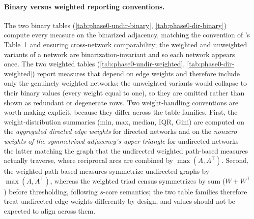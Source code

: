 \documentclass[11pt]{article}
\begin{document}
\paragraph{Binary versus weighted reporting conventions.} The two binary tables (\ref{tab:phase0-undir-binary}, \ref{tab:phase0-dir-binary}) compute every measure on the binarized adjacency, matching the convention of \citet{SmithMorganMoody2022}'s Table~1 and ensuring cross-network comparability; the weighted and unweighted variants of a network are binarization-invariant and so each network appears once. The two weighted tables (\ref{tab:phase0-undir-weighted}, \ref{tab:phase0-dir-weighted}) report measures that depend on edge weights and therefore include only the genuinely weighted networks: the unweighted variants would collapse to their binary values (every weight equal to one), so they are omitted rather than shown as redundant or degenerate rows. Two weight-handling conventions are worth making explicit, because they differ across the table families. First, the weight-distribution summaries (min, max, median, IQR, Gini) are computed on the \emph{aggregated directed edge weights} for directed networks and on the \emph{nonzero weights of the symmetrized adjacency's upper triangle} for undirected networks~--- the latter matching the graph that the undirected weighted path-based measures actually traverse, where reciprocal arcs are combined by $\max(A, A^\top)$. Second, the weighted path-based measures symmetrize undirected graphs by $\max(A, A^\top)$, whereas the weighted triad census symmetrizes by sum ($W + W^\top$) before thresholding, following $s$-core semantics; the two table families therefore treat undirected edge weights differently by design, and values should not be expected to align across them.
\end{document}
